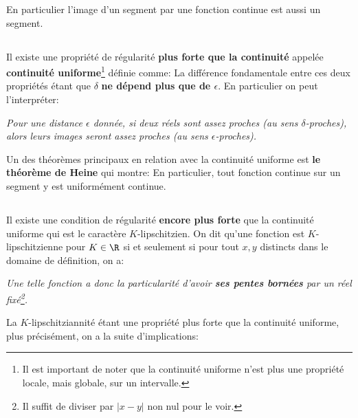 En particulier l'image d'un segment par une fonction continue est aussi un segment.

\subsection*{}

Il existe une propriété de régularité \textbf{plus forte que la continuité} appelée \textbf{continuité uniforme}\footnote[2]{Il est important de noter que la continuité uniforme n'est plus une propriété locale, mais globale, sur un intervalle.} définie comme:
La différence fondamentale entre ces deux propriétés étant que \(\delta\) \textbf{ne dépend plus que de \(\epsilon\)}. En particulier on peut l'interpréter:
\begin{center}
   \textit{Pour une distance \(\epsilon\) donnée, si deux réels sont assez proches (au sens \(\delta\)-proches), alors leurs images seront assez proches (au sens \(\epsilon\)-proches).}
\end{center}

Un des théorèmes principaux en relation avec la continuité uniforme est \textbf{le théorème de Heine} qui montre:
En particulier, tout fonction continue sur un segment y est uniformément continue.

\subsection*{}

Il existe une condition de régularité \textbf{encore plus forte} que la continuité uniforme qui est le caractère \(K\)-lipschitzien. On dit qu'une fonction est \(K\)-lipschitzienne pour \(K \in \R\) si et seulement si pour tout \(x, y\) distincts dans le domaine de définition, on a:
\begin{center}
   \textit{
      Une telle fonction a donc la particularité d'avoir \textbf{ses pentes bornées} par un réel fixé\footnote[1]{Il suffit de diviser par \(|x - y|\) non nul pour le voir.}.
   }
\end{center}
La \(K\)-lipschitziannité étant une propriété plus forte que la continuité uniforme, plus précisément, on a la suite d'implications:


